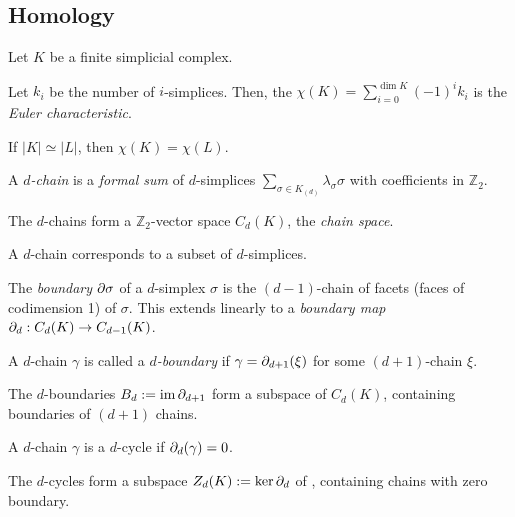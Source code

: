 \begin{multicols*}{3}
\section{Homology}
Let $K$ be a finite simplicial complex. \vspace{-0.6pc}
\begin{definition}
Let $k_i$ be the number of $i$-simplices. Then, the $\chi(K)=\sum_{i=0}^{\dim K}(-1)^i k_i$ is the \emph{Euler characteristic}.
\end{definition}
\rspace
\begin{rem}
If $|K| \simeq |L|$, then $\chi(K)=\chi(L)$.
\end{rem}
\rspace
\begin{definition}[$d$-chain]A \emph{$d$-chain} is a \emph{formal sum} of $d$-simplices
$\sum_{\sigma\in K_{(d)}} \lambda_\sigma \sigma$
with coefficients in  $\mathbb{Z}_2$.
\end{definition}
\rspace
\begin{defi}
The $d$-chains form a $\mathbb{Z}_2$-vector space $C_d(K)$, the \emph{chain space}.
\end{defi}
\rspace
\begin{rem}
A $d$-chain corresponds to a subset of $d$-simplices.
\end{rem}
\rspace
\begin{defi}
 The \emph{boundary} $\partial \sigma$ of a $d$-simplex $\sigma$ is the $(d-1)$-chain of facets (faces of codimension 1) of $\sigma$.  This extends linearly to a \emph{boundary map} $\partial_d: C_d(K) \to C_{d-1}(K)$.
 \end{defi}
\rspace
\begin{defi}[$d$-boundary]
A $d$-chain $\gamma$ is called a \emph{$d$-boundary} if $\gamma = \partial_{d+1}(\xi)$ for some $(d+1)$-chain $\xi$. 
\end{defi}
\rspace
\begin{rem}
The $d$-boundaries $B_d := \operatorname{im}\partial_{d+1}$ form a subspace of $C_d(K)$, containing boundaries of $(d+1)$ chains.
\end{rem}
\rspace
\begin{defi}[$d$-cycle]A $d$-chain $\gamma$ is a $d$-cycle if $\partial_d(\gamma)=0$. 
\end{defi}
\rspace
\begin{rem}
The $d$-cycles form a subspace $Z_d(K):=\operatorname{ker}\partial_d$ of , containing chains with zero boundary.
\end{rem}
\rspace \columnbreak
\begin{rem}

\end{rem}
\end{multicols*}
